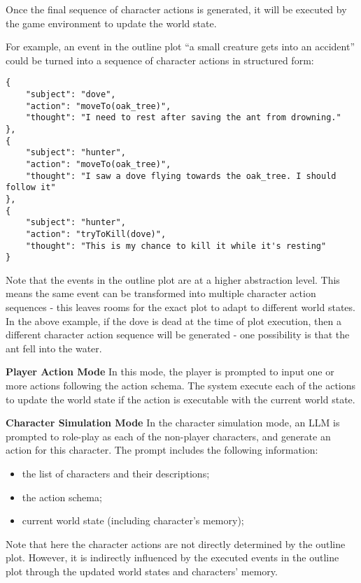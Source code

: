 Once the final sequence of character actions is generated, it will be executed by the game environment to update the world state. 
\begin{example}
For example, an event in the outline plot ``a small creature gets into an accident'' could be turned into a sequence of character actions in structured form:
\begin{verbatim}
{
    "subject": "dove",
    "action": "moveTo(oak_tree)",
    "thought": "I need to rest after saving the ant from drowning."
},
{
    "subject": "hunter",
    "action": "moveTo(oak_tree)",
    "thought": "I saw a dove flying towards the oak_tree. I should follow it"
},
{
    "subject": "hunter",
    "action": "tryToKill(dove)",
    "thought": "This is my chance to kill it while it's resting"
}
\end{verbatim}
\end{example}

Note that the events in the outline plot are at a higher abstraction level. This means the same event can be transformed into multiple character action sequences - this leaves rooms for the exact plot to adapt to different world states. In the above example, if the dove is dead at the time of plot execution, then a different character action sequence will be generated - one possibility is that the ant fell into the water.

\noindent \textbf{Player Action Mode} \hspace{2mm} In this mode, the player is prompted to input one or more actions following the action schema. The system execute each of the actions to update the world state if the action is executable with the current world state.

\noindent \textbf{Character Simulation Mode} \hspace{2mm} In the character simulation mode, an LLM is prompted to role-play as each of the non-player characters, and generate an action for this character. The prompt includes the following information:
\begin{itemize}
   \item the list of characters and their descriptions;
   \item the action schema;
   \item current world state (including character's memory);
\end{itemize}
Note that here the character actions are not directly determined by the outline plot. However, it is indirectly influenced by the executed events in the outline plot through the updated world states and characters' memory.


